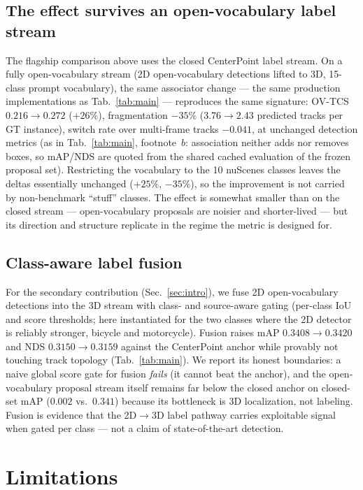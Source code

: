 \documentclass[10pt,twocolumn,letterpaper]{article}
\begin{document}
\subsection{The effect survives an open-vocabulary label stream}
The flagship comparison above uses the closed CenterPoint label stream. On a
fully open-vocabulary stream (2D open-vocabulary detections lifted to 3D,
15-class prompt vocabulary), the same associator change --- the same
production implementations as Tab.~\ref{tab:main} --- reproduces the same
signature: OV-TCS $0.216\!\to\!0.272$ ($+26\%$), fragmentation $-35\%$
($3.76\!\to\!2.43$ predicted tracks per GT instance), switch rate over
multi-frame tracks $-0.041$, at unchanged detection metrics (as in
Tab.~\ref{tab:main}, footnote~$b$: association neither adds nor removes
boxes, so mAP/NDS are quoted from the shared cached evaluation of the frozen
proposal set). Restricting the vocabulary to the 10 nuScenes classes leaves
the deltas essentially unchanged ($+25\%$, $-35\%$), so the improvement is
not carried by non-benchmark ``stuff'' classes. The effect is somewhat
smaller than on the closed stream --- open-vocabulary proposals are noisier
and shorter-lived --- but its direction and structure replicate in the regime
the metric is designed for.

\subsection{Class-aware label fusion}
\label{sec:fusion}
For the secondary contribution (Sec.~\ref{sec:intro}), we fuse 2D open-vocabulary
detections into the 3D stream with class- and source-aware gating (per-class
IoU and score thresholds; here instantiated for the two classes where the 2D
detector is reliably stronger, bicycle and motorcycle). Fusion raises mAP
$0.3408\!\to\!0.3420$ and NDS $0.3150\!\to\!0.3159$ against the CenterPoint
anchor while provably not touching track topology (Tab.~\ref{tab:main}).
We report its honest boundaries: a naive global score gate for fusion
\emph{fails} (it cannot beat the anchor), and the open-vocabulary proposal
stream itself remains far below the closed anchor on closed-set mAP
($0.002$ vs.\ $0.341$) because its bottleneck is 3D localization, not
labeling. Fusion is evidence that the 2D$\to$3D label pathway carries
exploitable signal when gated per class --- not a claim of state-of-the-art
detection.

\section{Limitations}
\label{sec:limitations}
\end{document}
